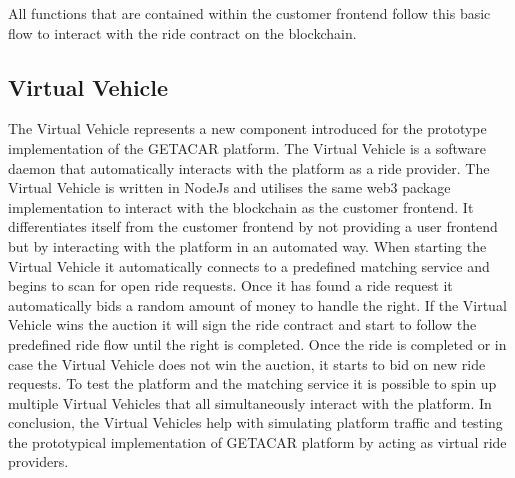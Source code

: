 All functions that are contained within the customer frontend follow this basic flow to interact with the ride contract on the blockchain.


\subsection{Virtual Vehicle}
The Virtual Vehicle represents a new component introduced for the prototype implementation of the GETACAR platform. The Virtual Vehicle is a software daemon that automatically interacts with the platform as a ride provider. The Virtual Vehicle is written in NodeJs and utilises the same web3 package implementation to interact with the blockchain as the customer frontend. It differentiates itself from the customer frontend by not providing a user frontend but by interacting with the platform in an automated way. When starting the Virtual Vehicle it automatically connects to a predefined matching service and begins to scan for open ride requests. Once it has found a ride request it automatically bids a random amount of money to handle the right. If the Virtual Vehicle wins the auction it will sign the ride contract and start to follow the predefined ride flow until the right is completed. Once the ride is completed or in case the Virtual Vehicle does not win the auction, it starts to bid on new ride requests. To test the platform and the matching service it is possible to spin up multiple Virtual Vehicles that all simultaneously interact with the platform. 
In conclusion, the Virtual Vehicles help with simulating platform traffic and testing the prototypical implementation of GETACAR platform by acting as virtual ride providers. 